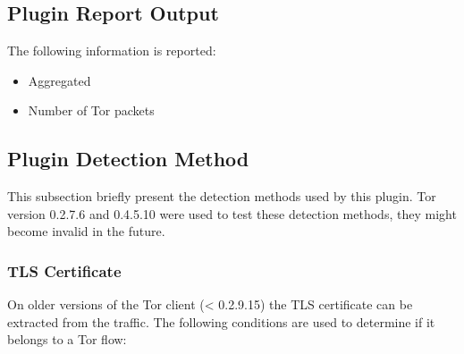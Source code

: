 \documentclass[documentation]{subfiles}
\begin{document}
\subsection{Plugin Report Output}
The following information is reported:
\begin{itemize}
    \item Aggregated {\tt{}}
    \item Number of Tor packets
\end{itemize}

\subsection{Plugin Detection Method}

This subsection briefly present the detection methods used by this plugin.
Tor version 0.2.7.6 and 0.4.5.10 were used to test these detection methods, they might become invalid in the future.

\subsubsection{TLS Certificate}

On older versions of the Tor client (< 0.2.9.15) the TLS certificate can be extracted from the traffic.
The following conditions are used to determine if it belongs to a Tor flow:
\end{document}
